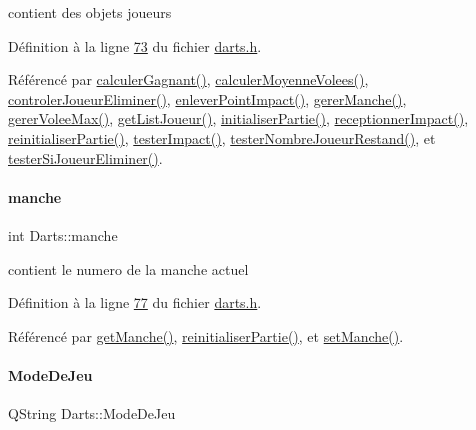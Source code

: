 contient des objets joueurs 



Définition à la ligne \hyperlink{darts_8h_source_l00073}{73} du fichier \hyperlink{darts_8h_source}{darts.\+h}.



Référencé par \hyperlink{darts_8cpp_source_l00433}{calculer\+Gagnant()}, \hyperlink{darts_8cpp_source_l00387}{calculer\+Moyenne\+Volees()}, \hyperlink{darts_8cpp_source_l00349}{controler\+Joueur\+Eliminer()}, \hyperlink{darts_8cpp_source_l00274}{enlever\+Point\+Impact()}, \hyperlink{darts_8cpp_source_l00303}{gerer\+Manche()}, \hyperlink{darts_8cpp_source_l00409}{gerer\+Volee\+Max()}, \hyperlink{darts_8cpp_source_l00055}{get\+List\+Joueur()}, \hyperlink{darts_8cpp_source_l00144}{initialiser\+Partie()}, \hyperlink{darts_8cpp_source_l00223}{receptionner\+Impact()}, \hyperlink{darts_8cpp_source_l00184}{reinitialiser\+Partie()}, \hyperlink{darts_8cpp_source_l00246}{tester\+Impact()}, \hyperlink{darts_8cpp_source_l00453}{tester\+Nombre\+Joueur\+Restand()}, et \hyperlink{darts_8cpp_source_l00372}{tester\+Si\+Joueur\+Eliminer()}.

\mbox{\label{class_darts_ac7b7bd23e64b4fab3895f02f085ea85f}} 
\paragraph{\texorpdfstring{manche}{manche}}
{\footnotesize\ttfamily int Darts\+::manche\hspace{0.3cm}{\ttfamily [private]}}



contient le numero de la manche actuel 



Définition à la ligne \hyperlink{darts_8h_source_l00077}{77} du fichier \hyperlink{darts_8h_source}{darts.\+h}.



Référencé par \hyperlink{darts_8cpp_source_l00044}{get\+Manche()}, \hyperlink{darts_8cpp_source_l00184}{reinitialiser\+Partie()}, et \hyperlink{darts_8cpp_source_l00132}{set\+Manche()}.

\mbox{\label{class_darts_a281fd6201343dfb65ab81c93fd60f786}} 
\paragraph{\texorpdfstring{Mode\+De\+Jeu}{ModeDeJeu}}
{\footnotesize\ttfamily Q\+String Darts\+::\+Mode\+De\+Jeu\hspace{0.3cm}{\ttfamily [private]}}



